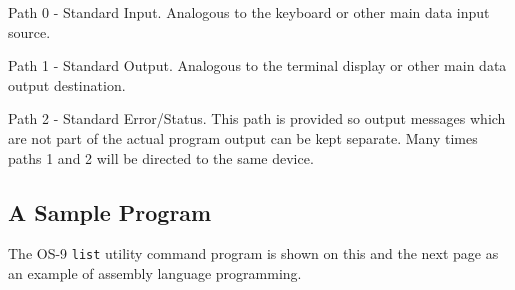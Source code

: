 \documentclass[
]{article}
\begin{document}
Path 0 - Standard Input. Analogous to the keyboard or other main data
input source.

Path 1 - Standard Output. Analogous to the terminal display or other
main data output destination.

Path 2 - Standard Error/Status. This path is provided so output messages
which are not part of the actual program output can be kept separate.
Many times paths 1 and 2 will be directed to the same device.

\subsection{A Sample Program}

The OS-9 \texttt{list} utility command program is shown on this and the
next page as an example of assembly language programming.
\end{document}
